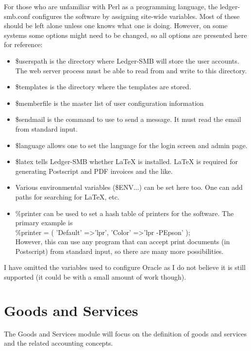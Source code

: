 \documentclass{article}
\begin{document}
For those who are unfamiliar with Perl as a programming language, the
ledger-smb.conf configures the software by assigning site-wide variables.  Most
of these should be left alone unless one knows what one is doing.  However, on
some systems some options might need to be changed, so all options are presented
here for reference:

\begin{itemize}
\item \$userspath is the directory where Ledger-SMB will store the user
accounts.  The web server process must be able to read from and write to this
directory.
\item \$templates is the directory where the templates are stored.
\item \$memberfile is the master list of user configuration information
\item \$sendmail is the command to use to send a message.  It must read the
email from standard input.
\item \$language allows one to set the language for the login screen and admin
page.
\item \$latex tells Ledger-SMB whether LaTeX is installed.  LaTeX is required
for generating Postscript and PDF invoices and the like.
\item Various environmental variables (\$ENV...) can be set here too.  One can
add paths for searching for LaTeX, etc.
\item \%printer can be used to set a hash table of printers for the software.
The primary example is\\ 
\%printer = ( 'Default' =\textgreater  'lpr', 'Color' =\textgreater  'lpr -PEpson' ); \\ 
However, this can use any program that can accept print documents (in
Postscript) from standard input, so there are many more possibilities.
\end{itemize}

I have omitted the variables used to configure Oracle as I do not believe it is
still supported (it could be with a small amount of work though).

\section{Goods and Services}

The Goods and Services module will focus on the definition of goods and services
and the related accounting concepts.
\end{document}
